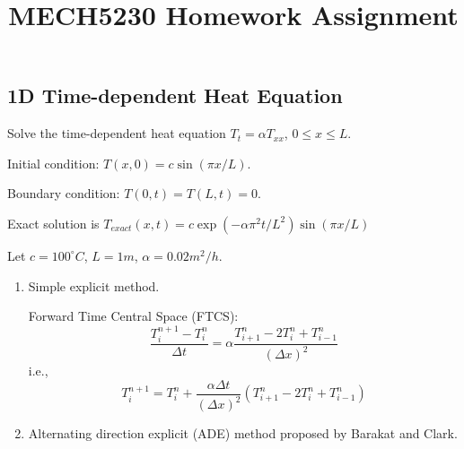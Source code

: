 \documentclass[12pt,a4paper]{article} %
\begin{document}
\begin{CJK}{UTF8}{song} %
\title{MECH5230 Homework Assignment}
\maketitle
\tableofcontents %
\newpage %






\section{1D Time-dependent Heat Equation}
Solve the time-dependent heat equation $T_{t}=\alpha T_{xx}$, $0 \leq x \leq L$.

Initial condition: $T(x,0)=c \sin(\pi x/L)$.

Boundary condition: $T(0,t)=T(L,t)=0$.

Exact solution is $T_{exact}(x,t)=c \exp (-\alpha \pi ^{2} t /L^{2})\sin (\pi x /L)$

Let $c=100^{\circ}C$, $L=1m$, $\alpha=0.02 m^{2}/h$.
\begin{enumerate}
  \item Simple explicit method.

Forward Time Central Space (FTCS):
\begin{equation}
\frac{T^{n+1}_{i}-T^{n}_{i}}{\Delta t}=\alpha \frac{T_{i+1}^{n}-2T_{i}^{n}+T_{i-1}^{n}}{(\Delta x)^{2}}
\end{equation}
i.e.,
\begin{equation}
T^{n+1}_{i}=T^{n}_{i}+\frac{\alpha \Delta t}{(\Delta x)^{2}}(T_{i+1}^{n}-2T_{i}^{n}+T_{i-1}^{n})
\end{equation}

  \item Alternating direction explicit (ADE) method proposed by Barakat and Clark.


\end{enumerate}
\end{CJK}
\end{document}
